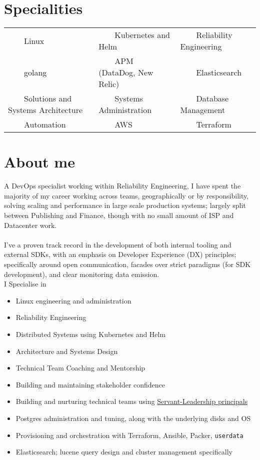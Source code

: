\documentclass[11pt,a4paper,sans]{article}
\newcommand{\tabitem}{~~\llap{\textbullet}~~}
\begin{document}
\newcommand{\job}{Principal Reliability Engineer}


\section{Specialities}
\begin{tabular}{lll}
  \tabitem Linux & \tabitem Kubernetes and Helm & \tabitem Reliability Engineering \\
  \tabitem golang & \tabitem APM (DataDog, New Relic) & \tabitem Elasticsearch \\
  \tabitem Solutions and Systems Architecture & \tabitem Systems Administration & \tabitem Database Management \\
  \tabitem Automation & \tabitem AWS & \tabitem Terraform  \\
\end{tabular}

\section{About me}
A DevOps specialist working within Reliability Engineering, I have spent the majority of my career working across teams, geographically or by responsibility, solving scaling and performance in large scale production systems; largely split between Publishing and Finance, though with no small amount of ISP and Datacenter work. \\
\\
I've a proven track record in the development of both internal tooling and external SDKs, with an emphasis on Developer Experience (DX) principles; specifically around open communication, facades over strict paradigms (for SDK development), and clear monitoring data emission.
\\
I Specialise in

\begin{itemize}
\item Linux engineering and administration
\item Reliability Engineering
\item Distributed Systems using Kubernetes and Helm
\item Architecture and Systems Design
\item Technical Team Coaching and Mentorship
\item Building and maintaining stakeholder confidence
\item Building and nurturing technical teams using \href{https://www.mindtools.com/pages/article/servant-leadership.htm}{Servant-Leadership principals}
\item Postgres administration and tuning, along with the underlying disks and OS
\item Provisioning and orchestration with Terraform, Ansible, Packer, \texttt{userdata}
\item Elasticsearch; lucene query design and cluster management specifically
\end{itemize}






\end{document}
